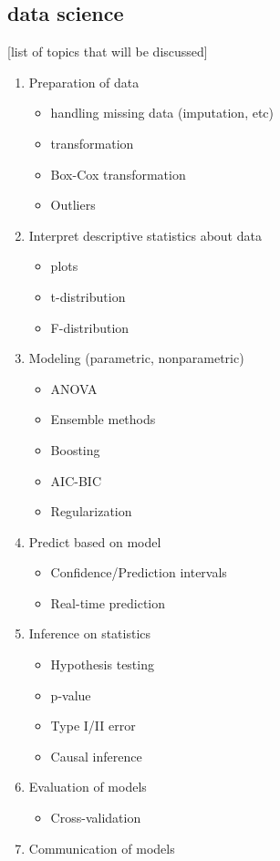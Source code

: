 \documentclass{article}
\theoremstyle{remark}
\begin{document}
\subsection*{data science}[list of topics that will be discussed]
\begin{enumerate}
\item Preparation of data
\begin{itemize}
\item handling missing data (imputation, etc)
\item transformation
\item Box-Cox transformation
\item Outliers
\end{itemize}

\item Interpret descriptive statistics about data
\begin{itemize}
\item plots
\item t-distribution
\item F-distribution
\end{itemize}

\item Modeling (parametric, nonparametric)
\begin{itemize}
\item ANOVA
\item Ensemble methods
\item Boosting
\item AIC-BIC
\item Regularization
\end{itemize}

\item Predict based on model
\begin{itemize}
\item Confidence/Prediction intervals
\item Real-time prediction
\end{itemize}

\item Inference on statistics
\begin{itemize}
\item Hypothesis testing
\item p-value
\item Type I/II error
\item Causal inference
\end{itemize}

\item Evaluation of models
\begin{itemize}
\item Cross-validation
\end{itemize}

\item Communication of models
\end{enumerate}
\end{document}
